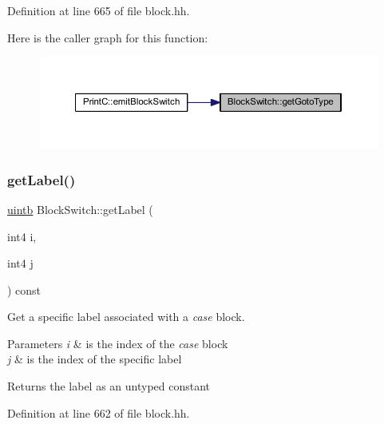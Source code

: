 Definition at line 665 of file block.\+hh.

Here is the caller graph for this function\+:
\nopagebreak
\begin{figure}[H]
\begin{center}
\leavevmode
\includegraphics[width=350pt]{class_block_switch_a053ffd21f364e19c3b1b6d7820be36dc_icgraph}
\end{center}
\end{figure}
\mbox{\label{class_block_switch_a96c22ddffa4cc1b28ad0a1942d9b7524}} 
\subsubsection{\texorpdfstring{getLabel()}{getLabel()}}
{\footnotesize\ttfamily \mbox{\hyperlink{types_8h_a2db313c5d32a12b01d26ac9b3bca178f}{uintb}} Block\+Switch\+::get\+Label (\begin{DoxyParamCaption}\item[{int4}]{i,  }\item[{int4}]{j }\end{DoxyParamCaption}) const\hspace{0.3cm}{\ttfamily [inline]}}



Get a specific label associated with a {\itshape case} block. 


\begin{DoxyParams}{Parameters}
{\em i} & is the index of the {\itshape case} block \\
\hline
{\em j} & is the index of the specific label \\
\hline
\end{DoxyParams}
\begin{DoxyReturn}{Returns}
the label as an untyped constant 
\end{DoxyReturn}


Definition at line 662 of file block.\+hh.

